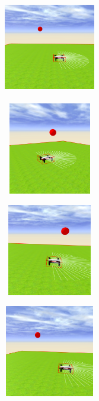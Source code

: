 \begin{figure}[H]

\begin{subfigure}[t]{0.3\textwidth}
  \includegraphics[width=4cm, height=4cm]{img/followBallTello2.png}
\label{fig:figure2_2}
\end{subfigure}\hfill
\begin{subfigure}[t]{0.3\textwidth}
    \includegraphics[width=4cm, height=4cm]{img/followBallTello3.png}
\label{fig:figure2_3}
\end{subfigure}\hfill
\begin{subfigure}[t]{0.3\textwidth}
    \includegraphics[width=4cm, height=4cm]{img/followBallTello4.png}
\label{fig:figure2_4}
\end{subfigure}
\begin{subfigure}[t]{0.3\textwidth}
    \includegraphics[width=4cm, height=4cm]{img/followBallTello6.png}

\end{subfigure}
\end{figure}
